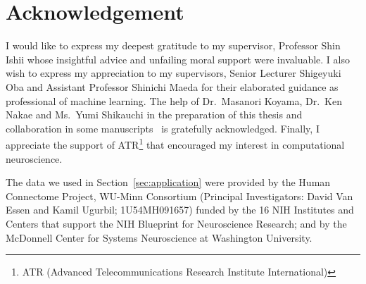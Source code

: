 \section{Acknowledgement}
%
I would like to express my deepest gratitude to my supervisor, Professor Shin Ishii whose
insightful advice and unfailing moral support were invaluable.
I also wish to express my appreciation to my supervisors,
Senior Lecturer Shigeyuki Oba and Assistant Professor Shinichi Maeda
for their elaborated guidance as professional of machine learning.
The help of Dr.\ Masanori Koyama, Dr.\ Ken Nakae and Ms.\ Yumi Shikauchi
in the preparation of this thesis and collaboration in some manuscripts~\cite{Koyamada2014a,Koyamada2014b,Koyamada2015}
is gratefully acknowledged.
Finally, I appreciate the support of ATR\footnote{ATR (Advanced
Telecommunications Research Institute International)} that encouraged my interest in
computational neuroscience.

The data we used in Section~\ref{sec:application} were provided by the Human Connectome Project,
WU-Minn Consortium
(Principal Investigators: David Van Essen and Kamil Ugurbil;
1U54MH091657) funded by the 16 NIH Institutes and Centers that support
the NIH Blueprint for Neuroscience Research; and by the McDonnell Center
for Systems Neuroscience at Washington University.
